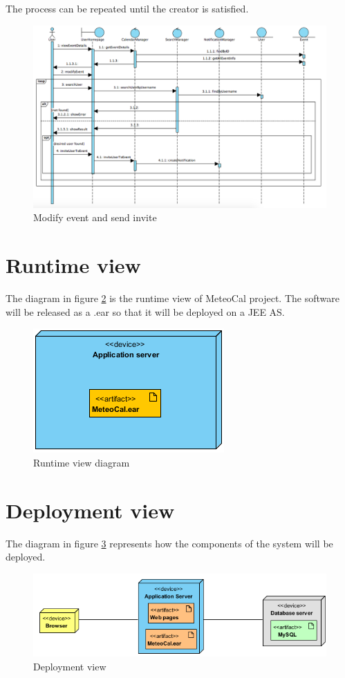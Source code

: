 \documentclass[10pt,a4paper,titlepage]{article}
\begin{document}
The process can be repeated until the creator is satisfied.
\begin{figure}[h!]
\centering
\includegraphics[width=\linewidth]{./images/modify+invite_sequence}
\caption[Invite sequence]{Modify event and send invite}
\label{fig:modify+invite_sequence}
\end{figure}

\clearpage
\section{Runtime view}
The diagram in figure \ref{fig:runtime_view} is the runtime view of MeteoCal project. The software will be released as a .ear so that it will be deployed on a JEE AS.
\begin{figure}[h]
\centering
\includegraphics[width=0.5\linewidth]{./images/runtime_view}
\caption[runtime view]{Runtime view diagram}
\label{fig:runtime_view}
\end{figure}

\section{Deployment view}
The diagram in figure \ref{fig:deployment_view} represents how the components of the system will be deployed.
\begin{figure}[h]
\centering
\includegraphics[width=\linewidth]{./images/deployment_view}
\caption[deploy]{Deployment view}
\label{fig:deployment_view}
\end{figure}
\end{document}

